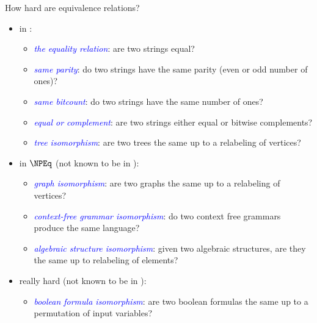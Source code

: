 \documentclass[final]{beamer}
\newcommand{\emphblue}[1]{\emph{\textcolor{blue}{#1}}}
\begin{document}
\begin{frame}{}
\begin{columns}[t]
\begin{column}{.3\linewidth}
      \begin{block}{\LARGE How hard are equivalence relations?}
        \Large
        \begin{itemize}
          \setlength{\itemsep}{20pt}
        \item in \PEq:
          \begin{itemize}\Large
          \item \emphblue{the equality relation}: are two strings equal?
          \item \emphblue{same parity}: do two strings have the same parity
            (even or odd number of ones)?
          \item \emphblue{same bitcount}: do two strings have the same number
            of ones?
          \item \emphblue{equal or complement}: are two strings either equal or
            bitwise complements?
          \item \emphblue{tree isomorphism}: are two trees the same up to a
            relabeling of vertices?
          \end{itemize}
        \item in $\NPEq$ (not known to be in \PEq):
          \begin{itemize}\Large
          \item \emphblue{graph isomorphism}: are two graphs the same up to a
            relabeling of vertices?
          \item \emphblue{context-free grammar isomorphism}: do two context
            free grammars produce the same language?
          \item \emphblue{algebraic structure isomorphism}: given two algebraic
            structures, are they the same up to relabeling of elements?
          \end{itemize}
        \item really hard (not known to be in \NPEq):
          \begin{itemize}\Large
          \item \emphblue{boolean formula isomorphism}: are two boolean
            formulas the same up to a permutation of input variables?
          \end{itemize}
        \end{itemize}
      \end{block}


\end{column}
\end{columns}
\end{frame}
\end{document}
